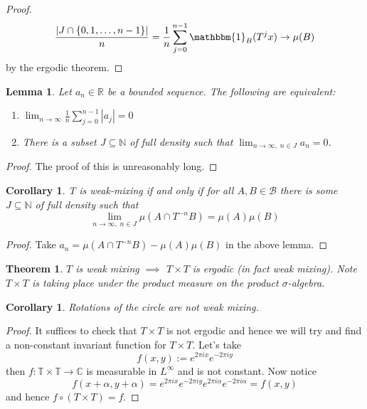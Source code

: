 \documentclass[11pt]{article}
\newcommand{\defeq}{:=}
\newcommand{\abs}[1]{\left|#1\right|}
\newcommand{\indic}[1]{\mathbbm{1}_{#1}}
\newcommand{\R}{\mathbb{R}}
\newcommand{\N}{\mathbb{N}}
\newcommand{\C}{\mathbb{C}}
\newtheorem{theorem}[prop]{Theorem}
\newtheorem{lemma}[prop]{Lemma}
\newtheorem{cor}[prop]{Corollary}
\begin{document}
\begin{proof}
\[
	\frac{\abs{J\cap \left\{ 0, 1, \dots, n-1\right\}}}{n}= \frac{1}{n}\sum_{j=0}^{n-1}\indic{B}(T^j x) \to \mu(B)
\]
by the ergodic theorem.
\end{proof}

\begin{lemma}
Let $a_n\in\R$ be a bounded sequence.
The following are equivalent:
\begin{enumerate}
	\item $\lim_{n\to\infty}\frac{1}{n}\sum_{j=0}^{n-1}\abs{a_j} = 0$
	\item There is a subset $J\subseteq\N$ of full density such that $\lim_{n\to\infty, \; n\in J}a_n =0$.
\end{enumerate}
\end{lemma}

\begin{proof}
The proof of this is unreasonably long.
\end{proof}

\begin{cor}
	T is weak-mixing if and only if for all $A,B \in \mathcal{B}$ there is some $J\subseteq\N$ of full density such that
	\[
		\lim_{n\to\infty, \; n\in J}\mu(A\cap T^{-n}B) = \mu(A)\mu(B)
	\]
\end{cor}

\begin{proof}
Take $a_n = \mu(A \cap T^{-n}B) - \mu(A)\mu(B)$ in the above lemma.
\end{proof}

\begin{theorem}
$T$ is weak mixing $\implies$ $T\times T$ is ergodic (in fact weak mixing).
Note $T\times T$ is taking place under the product measure on the product $\sigma$-algebra.
\end{theorem}

\begin{cor}
Rotations of the circle are not weak mixing.
\end{cor}

\begin{proof}
It suffices to check that $T\times T$ is not ergodic and hence we will try and find a non-constant invariant function for $T\times T$.
Let's take
\[
	f(x,y)\defeq e^{2\pi i x} e^{-2\pi i y}
\]
then $f:\mathbb{T}\times\mathbb{T}\to \C$ is measurable in $L^\infty$ and is not constant.
Now notice
\[
	f(x+ \alpha, y + \alpha) = e^{2\pi i x} e^{-2\pi i y} e^{2 \pi i \alpha} e^{-2\pi i \alpha} = f(x, y)
\]
and hence $f\circ (T\times T) = f$.
\end{proof}
\end{document}
